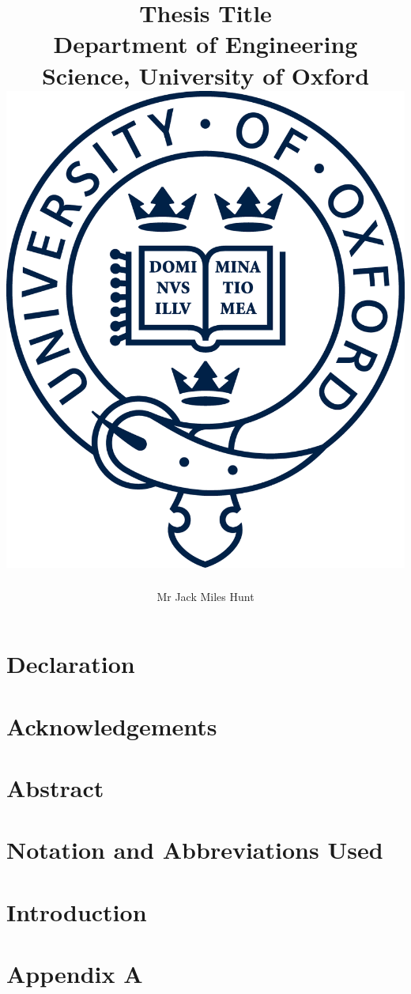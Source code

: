 \documentclass[12pt]{report}
\title{
    {Thesis Title}\\
    {\large Department of Engineering Science, University of Oxford}\\
    {\includegraphics[scale=0.3]{pre_chapters/figures/oxford_logo.png}}
}
\author{Mr Jack Miles Hunt}
\date{}
\begin{document}
\maketitle
\chapter*{Declaration}


\chapter*{Acknowledgements}


\chapter*{Abstract}


\chapter*{Notation and Abbreviations Used}


\tableofcontents
\listoffigures
\listoftables
\chapter{Introduction}


\appendix
\chapter{Appendix A}

\appendix


\end{document}

